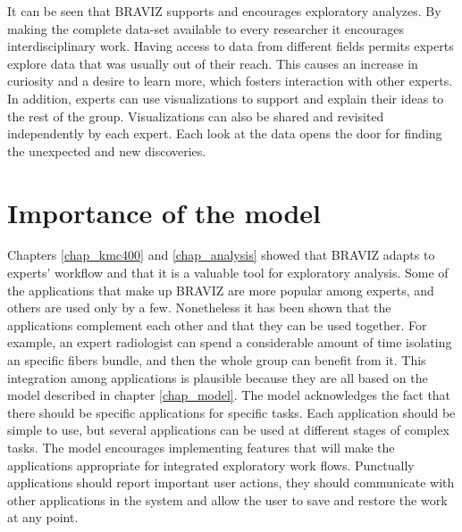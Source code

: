 It can be seen that BRAVIZ supports and encourages exploratory analyzes. By making the complete data-set available to every researcher it encourages interdisciplinary work. Having access to data from different fields permits experts explore data that was usually out of their reach. This causes an increase in curiosity and a desire to learn more, which fosters interaction with other experts. In addition, experts can use visualizations to support and explain their ideas to the rest of the group. Visualizations can also be shared and revisited independently by each expert. Each look at the data opens the door for finding the unexpected and new discoveries. 


\section{Importance of the model}


Chapters \ref{chap_kmc400} and \ref{chap_analysis} showed that BRAVIZ adapts to experts' workflow and that it is a valuable tool for exploratory analysis. Some of the applications that make up BRAVIZ are more popular among experts, and others are used only by a few. Nonetheless it has been shown that the applications complement each other and that they can be used together. For example, an expert radiologist can spend a considerable amount of time isolating an specific fibers bundle, and then the whole group can benefit from it.
This integration among applications is plausible because they are all based on the model described in chapter \ref{chap_model}. The model acknowledges the fact that there should be specific applications for specific tasks. Each application should be simple to use, but several applications can be used at different stages of complex tasks. The model encourages implementing features that will make the applications appropriate for integrated exploratory work flows. Punctually applications should report important user actions, they should communicate with other applications in the system and allow the user to save and restore the work at any point. 

